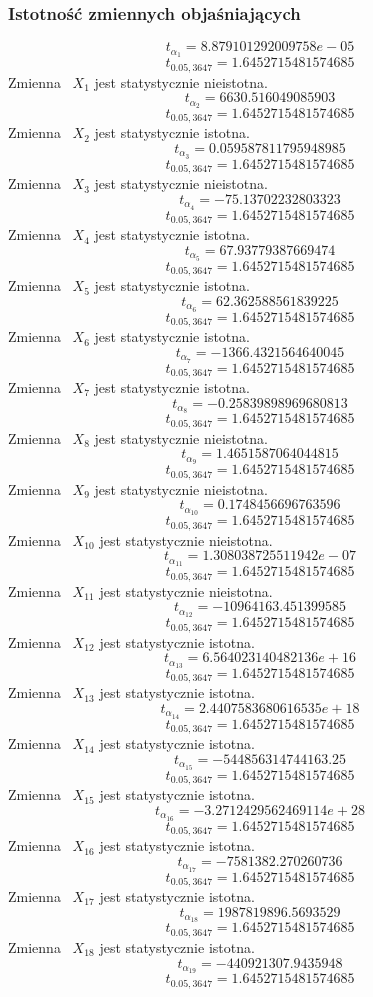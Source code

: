 \subsubsection{Istotność zmiennych objaśniających}
\[t_{\alpha_{1}} = 8.879101292009758e-05\]
\[t_{0.05, 3647} = 1.6452715481574685\]
Zmienna ~$X_{1}$ jest statystycznie nieistotna.
\[t_{\alpha_{2}} = 6630.516049085903\]
\[t_{0.05, 3647} = 1.6452715481574685\]
Zmienna ~$X_{2}$ jest statystycznie istotna.
\[t_{\alpha_{3}} = 0.059587811795948985\]
\[t_{0.05, 3647} = 1.6452715481574685\]
Zmienna ~$X_{3}$ jest statystycznie nieistotna.
\[t_{\alpha_{4}} = -75.13702232803323\]
\[t_{0.05, 3647} = 1.6452715481574685\]
Zmienna ~$X_{4}$ jest statystycznie istotna.
\[t_{\alpha_{5}} = 67.93779387669474\]
\[t_{0.05, 3647} = 1.6452715481574685\]
Zmienna ~$X_{5}$ jest statystycznie istotna.
\[t_{\alpha_{6}} = 62.362588561839225\]
\[t_{0.05, 3647} = 1.6452715481574685\]
Zmienna ~$X_{6}$ jest statystycznie istotna.
\[t_{\alpha_{7}} = -1366.4321564640045\]
\[t_{0.05, 3647} = 1.6452715481574685\]
Zmienna ~$X_{7}$ jest statystycznie istotna.
\[t_{\alpha_{8}} = -0.25839898969680813\]
\[t_{0.05, 3647} = 1.6452715481574685\]
Zmienna ~$X_{8}$ jest statystycznie nieistotna.
\[t_{\alpha_{9}} = 1.4651587064044815\]
\[t_{0.05, 3647} = 1.6452715481574685\]
Zmienna ~$X_{9}$ jest statystycznie nieistotna.
\[t_{\alpha_{10}} = 0.1748456696763596\]
\[t_{0.05, 3647} = 1.6452715481574685\]
Zmienna ~$X_{10}$ jest statystycznie nieistotna.
\[t_{\alpha_{11}} = 1.308038725511942e-07\]
\[t_{0.05, 3647} = 1.6452715481574685\]
Zmienna ~$X_{11}$ jest statystycznie nieistotna.
\[t_{\alpha_{12}} = -10964163.451399585\]
\[t_{0.05, 3647} = 1.6452715481574685\]
Zmienna ~$X_{12}$ jest statystycznie istotna.
\[t_{\alpha_{13}} = 6.564023140482136e+16\]
\[t_{0.05, 3647} = 1.6452715481574685\]
Zmienna ~$X_{13}$ jest statystycznie istotna.
\[t_{\alpha_{14}} = 2.4407583680616535e+18\]
\[t_{0.05, 3647} = 1.6452715481574685\]
Zmienna ~$X_{14}$ jest statystycznie istotna.
\[t_{\alpha_{15}} = -544856314744163.25\]
\[t_{0.05, 3647} = 1.6452715481574685\]
Zmienna ~$X_{15}$ jest statystycznie istotna.
\[t_{\alpha_{16}} = -3.2712429562469114e+28\]
\[t_{0.05, 3647} = 1.6452715481574685\]
Zmienna ~$X_{16}$ jest statystycznie istotna.
\[t_{\alpha_{17}} = -7581382.270260736\]
\[t_{0.05, 3647} = 1.6452715481574685\]
Zmienna ~$X_{17}$ jest statystycznie istotna.
\[t_{\alpha_{18}} = 1987819896.5693529\]
\[t_{0.05, 3647} = 1.6452715481574685\]
Zmienna ~$X_{18}$ jest statystycznie istotna.
\[t_{\alpha_{19}} = -440921307.9435948\]
\[t_{0.05, 3647} = 1.6452715481574685\]
